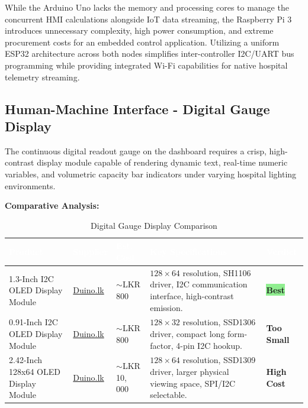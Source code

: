 \documentclass[12pt,a4paper]{article}
\newcommand{\badgegreen}[1]{%
  \colorbox{lightgreen}{\textcolor{badgegreen}{\footnotesize\textbf{#1}}}%
}
\newcommand{\badgeamber}[1]{%
  \colorbox{lightamber}{\textcolor{badgeamber}{\footnotesize\textbf{#1}}}%
}
\begin{document}
While the Arduino Uno lacks the memory and processing cores to manage the concurrent HMI calculations alongside IoT data streaming, the Raspberry Pi 3 introduces unnecessary complexity, high power consumption, and extreme procurement costs for an embedded control application. Utilizing a uniform ESP32 architecture across both nodes simplifies inter-controller I2C/UART bus programming while providing integrated Wi-Fi capabilities for native hospital telemetry streaming.

\newpage
\subsection{Human-Machine Interface - Digital Gauge Display}

The continuous digital readout gauge on the dashboard requires a crisp, high-contrast display module capable of rendering dynamic text, real-time numeric variables, and volumetric capacity bar indicators under varying hospital lighting environments.

\vspace{0.3cm}
\noindent\textbf{Comparative Analysis:}

\begin{table}[H]
\centering
\setlength{\tabcolsep}{5pt}
\renewcommand{\arraystretch}{1.4}
\begin{tabular}{|p{3.2cm}|p{3.5cm}|p{2.2cm}|p{3.5cm}|p{2cm}|}
\hline
\rowcolor{headerblue}
\textcolor{white}{\textbf{Product}} &
\textcolor{white}{\textbf{Supplier}} &
\textcolor{white}{\textbf{Est. Cost}} &
\textcolor{white}{\textbf{Key Specifications}} &
\textcolor{white}{\textbf{Verdict}} \\
\hline
\rowcolor{chosen}
1.3-Inch I2C OLED Display Module &
\href{https://www.duino.lk/product/1-3-inches-i2c-oled-display-iic-interface-display/}{Duino.lk} &
$\sim$LKR 800 &
$128\times64$ resolution, SH1106 driver, I2C communication interface, high-contrast emission. &
\badgegreen{Best} \\
\hline
0.91-Inch I2C OLED Display Module &
\href{https://www.duino.lk/product/0-91-inch-oled-display-module-white-blue/}{Duino.lk} &
$\sim$LKR 800 &
$128\times32$ resolution, SSD1306 driver, compact long form-factor, 4-pin I2C hookup. &
\badgeamber{Too Small} \\
\hline
2.42-Inch 128x64 OLED Display Module &
\href{https://www.duino.lk/product/2-42-inch-128x64-oled-display-ssd1309/}{Duino.lk} &
$\sim$LKR 10, 000 &
$128\times64$ resolution, SSD1309 driver, larger physical viewing space, SPI/I2C selectable. &
\badgeamber{High Cost} \\
\hline
\end{tabular}
\caption{Digital Gauge Display Comparison}
\end{table}
\end{document}
